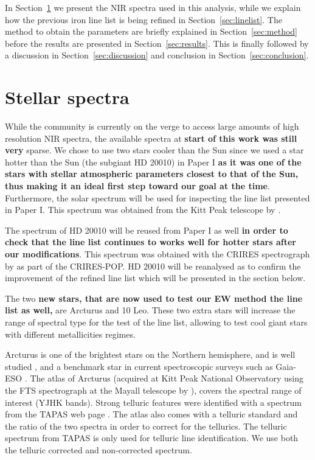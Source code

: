 \documentclass{aa}
\begin{document}
{In Section~\ref{sec:data} we present the NIR spectra used in this analysis, while we explain how the
previous iron line list is being refined in Section~\ref{sec:linelist}. The method to obtain the
parameters are briefly explained in Section~\ref{sec:method} before the results are presented in
Section~\ref{sec:results}. This is finally followed by a discussion in Section~\ref{sec:discussion}
and conclusion in Section~\ref{sec:conclusion}.
}




\section{Stellar spectra}
\label{sec:data}

While the community is currently on the verge to access large amounts of high resolution NIR
spectra, the available spectra at {\bf start of this work was still very} sparse. We chose to use
two stars cooler than the Sun since we used a star hotter than the Sun (the subgiant HD 20010) in
Paper I {\bf as it was one of the stars with stellar atmospheric parameters closest to that of the
Sun, thus making it an ideal first step toward our goal at the time}. Furthermore, the solar
spectrum will be used for inspecting the line list presented in Paper I. This spectrum was obtained
from the Kitt Peak telescope by \citet{Hinkle1995}.

The spectrum of HD 20010 will be reused from Paper I as well {\bf in order to check that the line
list continues to works well for hotter stars after our modifications}. This spectrum was obtained
with the CRIRES spectrograph by \citet{Lebzelter2012} as part of the CRIRES-POP. HD 20010 will be
reanalysed as to confirm the improvement of the refined line list which will be presented in the
section below.

The two {\bf new stars, that are now used to test our EW method the line list as well,} are Arcturus
and 10 Leo. These two extra stars will increase the range of spectral type for the test of the line
list, allowing to test cool giant stars with different metallicities regimes.

Arcturus is one of the brightest stars on the Northern hemisphere, and is well
studied \citep[see e.g.][to mention just a
few]{Griffin1967,McWilliam1990,Ramirez2013}, and a benchmark star in
current spectroscopic surveys such as Gaia-ESO \citep{Jofre2014,Smiljanic2014}.
The atlas of Arcturus (acquired at Kitt Peak National Observatory using the FTS
spectrograph at the Mayall telescope by \citet{Hinkle1995a}), covers the
spectral range of interest (YJHK bands). Strong telluric features were
identified with a spectrum from the TAPAS web page \citep{Bertaux2014}. The
atlas also comes with a telluric standard and the ratio of the two spectra in
order to correct for the tellurics. The telluric spectrum from TAPAS is only
used for telluric line identification. We use both the telluric corrected and
non-corrected spectrum.
\end{document}
